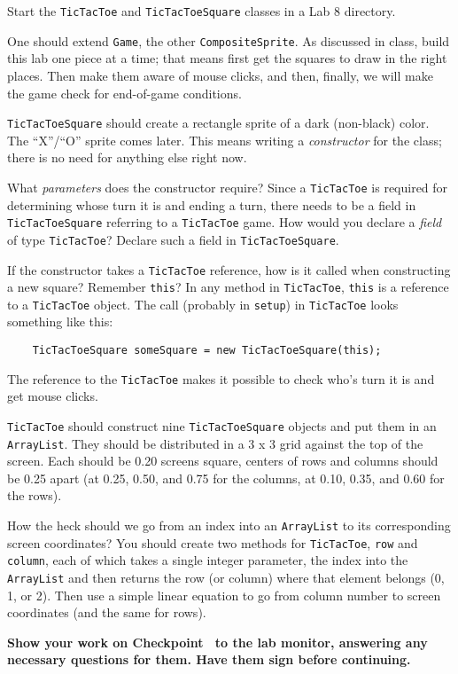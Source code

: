 \documentclass[12pt,oneside]{memoir}
\newcommand\code[1]{\lstinline^#1^}
\newenvironment{Checkpoint}[1]{%
  \begin{Exercise}[name={Checkpoint},title={#1}]}{%
  \end{Exercise}%
  \textbf{Show your work on Checkpoint~\theExercise{} to the lab monitor, %
    answering any necessary questions for them.  Have them sign before continuing.}}
\begin{document}
\begin{Checkpoint}{Define classes}
  Start the \code{TicTacToe} and \code{TicTacToeSquare} classes in a
  Lab 8 directory. 

  One should extend \code{Game}, the other \code{CompositeSprite}. As
  discussed in class, build this lab one piece at a time; that means
  first get the squares to draw in the right places. Then make them
  aware of mouse clicks, and then, finally, we will make the game
  check for end-of-game conditions.

  \code{TicTacToeSquare} should create a rectangle sprite of a dark
  (non-black) color. The ``X''/``O'' sprite comes later. This means
  writing a \emph{constructor} for the class; there is no need for
  anything else right now.

  What \emph{parameters} does the constructor require? Since a
  \code{TicTacToe} is required for determining  whose turn it is and
  ending a turn, there needs to be a field in \code{TicTacToeSquare}
  referring to a \code{TicTacToe} game. How would you declare a
  \emph{field} of type \code{TicTacToe}? Declare such a field in
  \code{TicTacToeSquare}.

  If the constructor takes a \code{TicTacToe} reference, how is it
  called when constructing a new square? Remember \code{this}? In any
  method in \code{TicTacToe}, \code{this} is a reference to a
  \code{TicTacToe} object. The call (probably in \code{setup}) in
  \code{TicTacToe} looks something like this:

  \begin{lstlisting}
    TicTacToeSquare someSquare = new TicTacToeSquare(this);
  \end{lstlisting}

  The reference to the \code{TicTacToe} makes it possible to check who's
  turn it is and get mouse clicks.

  \code{TicTacToe} should construct nine \code{TicTacToeSquare}
  objects and put them in an \code{ArrayList}. They should be
  distributed in a 3 x 3 grid against the top of the screen. Each
  should be 0.20 screens square, centers of rows and columns should be
  0.25 apart (at 0.25, 0.50, and 0.75 for the columns, at 0.10, 0.35,
  and 0.60 for the rows).

  How the heck should we go from an index into an \code{ArrayList} to
  its corresponding screen coordinates? You should create two methods
  for \code{TicTacToe}, \code{row} and \code{column}, each of which
  takes a single integer parameter, the index into the
  \code{ArrayList} and then returns the row (or column) where that
  element belongs (0, 1, or 2). Then use a simple linear
  equation to go from column number to screen coordinates (and the
  same for rows).


\end{Checkpoint}
\end{document}
